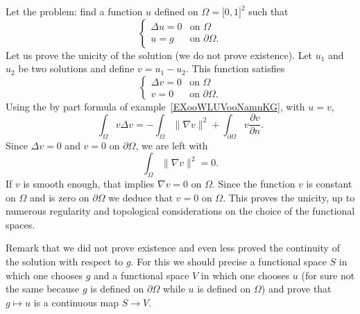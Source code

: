 \begin{example}          \label{EXooLTODooOwJtGC}
    Let the problem: find a function \( u\) defined on \( \Omega=\mathopen[ 0 , 1 \mathclose]^2\) such that
    \begin{equation}
         \begin{cases}
             \Delta u=0    &   \text{on } \Omega\\
             u=g    &    \text{on } \partial\Omega.
         \end{cases}
     \end{equation}
     Let us prove the unicity of the solution (we do not prove existence). Let \( u_1\) and \( u_2\) be two solutions and define \( v=u_1-u_2\). This function satisfies
     \begin{equation}
          \begin{cases}
              \Delta v=0    &   \text{on } \Omega\\
              v=0    &    \text{on }\partial\Omega.
          \end{cases}
      \end{equation}
      Using the by part formula of example~\ref{EXooWLUVooNamnKG}, with \( u=v\),
      \begin{equation}
          \int_{\Omega}v\Delta v=-\int_{\Omega}\| \nabla v \|^2+\int_{\partial\Omega}v\frac{ \partial v }{ \partial n }.
      \end{equation}
      Since \( \Delta v=0\) and \( v=0\) on \( \partial\Omega\), we are left with
      \begin{equation}
          \int_{\Omega}\| \nabla v \|^2=0.
      \end{equation}
      If \( v\) is smooth enough, that implies \( \nabla v=0\) on \( \Omega\). Since the function \( v\) is constant on \( \Omega\) and is zero on \( \partial\Omega\) we deduce that \( v=0\) on \( \Omega\). This proves the unicity, up to numerous regularity and topological considerations on the choice of the functional spaces.

     Remark that we did not prove existence and even less proved the continuity of the solution with respect to \( g\). For this we should precise a functional space \( S\) in which one chooses \( g\) and a functional space \( V\) in which one chooses \( u\) (for sure not the same because \( g\) is defined on \( \partial \Omega\) while \( u\) is defined on \( \Omega\)) and prove that \( g\mapsto u\) is a continuous map \( S\to V\).
\end{example}

